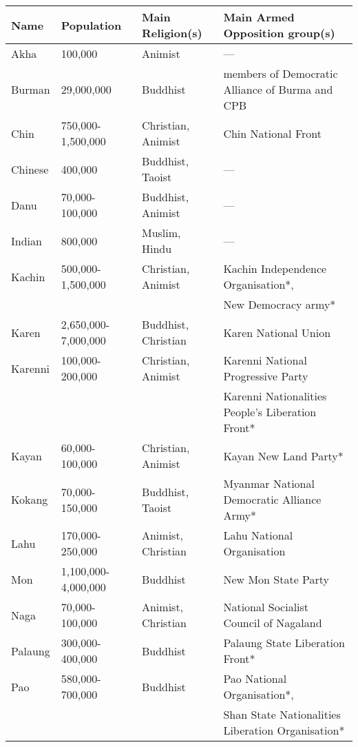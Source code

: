 \documentclass{article}
\begin{document}
\begin{table}[htbp]
\centering

\begin{tabular}{@{}lllp{5.5cm}@{}}

\toprule
Name    & Population          & Main Religion(s)   & Main Armed Opposition group(s) \\
\midrule
Akha    & 100,000             & Animist            & --- \\
Burman  & 29,000,000          & Buddhist           & members of Democratic Alliance of Burma and CPB \\
Chin    & 750,000-1,500,000   & Christian, Animist & Chin National Front \\
Chinese & 400,000             & Buddhist, Taoist   & --- \\
Danu    & 70,000-100,000      & Buddhist, Animist  & --- \\
Indian  & 800,000             & Muslim, Hindu      & --- \\
Kachin  & 500,000-1,500,000   & Christian, Animist & Kachin Independence Organisation*, \\
        &                     &                    & New Democracy army* \\
Karen   & 2,650,000-7,000,000 & Buddhist, Christian & Karen National Union \\
Karenni & 100,000-200,000     & Christian, Animist & Karenni National Progressive Party \\
        &                     &                    & Karenni Nationalities People's Liberation Front* \\
Kayan   & 60,000-100,000      & Christian, Animist & Kayan New Land Party* \\
Kokang  & 70,000-150,000      & Buddhist, Taoist   & Myanmar National Democratic Alliance Army* \\
Lahu    & 170,000-250,000     & Animist, Christian & Lahu National Organisation \\
Mon     & 1,100,000-4,000,000 & Buddhist           & New Mon State Party \\
Naga    & 70,000-100,000      & Animist, Christian & National Socialist Council of Nagaland \\
Palaung & 300,000-400,000     & Buddhist           & Palaung State Liberation Front* \\
Pao     & 580,000-700,000     & Buddhist           & Pao National Organisation*, \\
        &                     &                    & Shan State Nationalities Liberation Organisation* \\

\end{tabular}
\end{table}
\end{document}
